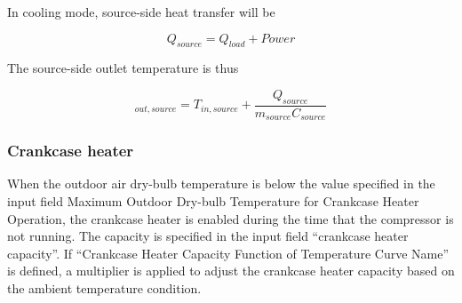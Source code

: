 In cooling mode, source-side heat transfer will be

\begin{equation}
Q_{source} = Q_{load} + Power 
\end{equation}

The source-side outlet temperature is thus

\begin{equation}
_{out,source} = T_{in,source} + \frac{Q_{source}}{m_{source}C_{source}} 
\end{equation}

\subsubsection{Crankcase heater}

When the outdoor air dry-bulb temperature is below the value specified in the
input field Maximum Outdoor Dry-bulb Temperature for Crankcase Heater Operation,
the crankcase heater is enabled during the time that the compressor is not
running. The capacity is specified in the input field ``crankcase heater
capacity''. If ``Crankcase Heater Capacity Function of Temperature Curve Name'' is
defined, a multiplier is applied to adjust the crankcase heater capacity based
on the ambient temperature condition.